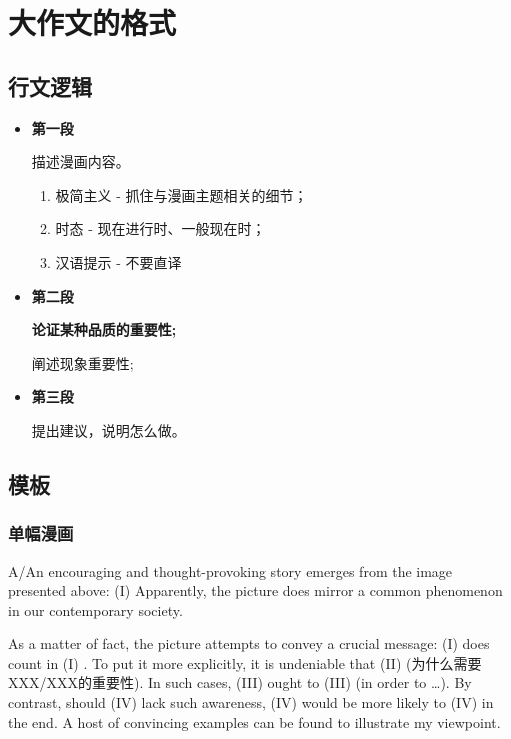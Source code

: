\chapter*{大作文的格式}

\section{行文逻辑}

\begin{itemize}
    \item \textbf{第一段}
    
    描述漫画内容。

    \begin{enumerate}[label = \Alph*.]
        \item 极简主义 - 抓住与漫画主题相关的细节；
        \item 时态 - 现在进行时、一般现在时；
        \item 汉语提示 - 不要直译
    \end{enumerate}
    \item \textbf{第二段}
    
    \textbf{论证某种品质的重要性;}

    阐述现象重要性;
    \item \textbf{第三段}
    
    提出建议，说明怎么做。
\end{itemize}

\newpage

\section{模板}

\subsection{单幅漫画}

A/An encouraging and thought-provoking story 
emerges from the image presented above: \textrm{(I)}
Apparently, the picture does mirror a common phenomenon in our contemporary society.

As a matter of fact, the picture
attempts to convey a crucial message:
\textrm{(I)} does count in \textrm{(I)} .
To put it more explicitly, it is undeniable that 
\textrm{(II)} (为什么需要XXX/XXX的重要性).
In such cases, \textrm{(III)} ought to \textrm{(III)}
(in order to \dots).
By contrast, should \textrm{(IV)} lack such awareness, \textrm{(IV)}
would be more likely to \textrm{(IV)} in the end.
A host of convincing examples can be found to illustrate my viewpoint.

